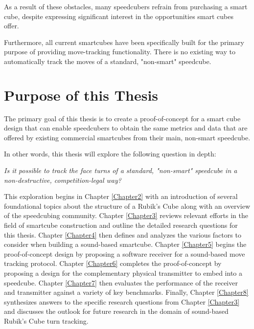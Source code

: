 As a result of these obstacles, many speedcubers refrain from
purchasing a smart cube, despite expressing significant interest in the
opportunities smart cubes offer.

Furthermore, all current smartcubes have been specifically built for
the primary purpose of providing move-tracking functionality. There is
no existing way to automatically track the moves of a standard,
"non-smart" speedcube.


\section{Purpose of this Thesis}
\label{sec:thesis-purpose}

The primary goal of this thesis is to create a proof-of-concept for a
smart cube design that can enable speedcubers to obtain the same
metrics and data that are offered by existing commercial smartcubes
from their main, non-smart speedcube.

In other words, this thesis will explore the following question in depth:

\emph{Is it possible to track the face turns of a standard, "non-smart"
speedcube in a non-destructive, competition-legal way?}

This exploration begins in Chapter \ref{Chapter2} with an introduction
of several foundational topics about the structure of a Rubik's Cube
along with an overview of the speedcubing community. Chapter
\ref{Chapter3} reviews relevant efforts in the field of smartcube
construction and outline the detailed research questions for this
thesis. Chapter \ref{Chapter4} then defines and analyzes the various
factors to consider when building a sound-based smartcube. Chapter
\ref{Chapter5} begins the proof-of-concept design by proposing a
software receiver for a sound-based move tracking protocol. Chapter
\ref{Chapter6} completes the proof-of-concept by proposing a design for
the complementary physical transmitter to embed into a speedcube.
Chapter \ref{Chapter7} then evaluates the performance of the receiver
and transmitter against a variety of key benchmarks. Finally, Chapter
\ref{Chapter8} synthesizes answers to the specific research questions
from Chapter \ref{Chapter3} and discusses the outlook for future
research in the domain of sound-based Rubik's Cube turn tracking.
